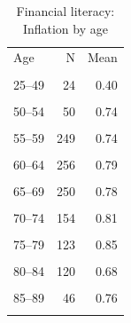 \begin{table}[htbp]\centering\small
\caption{Financial literacy: Inflation by age}
\label{tab:finlit_q2_by_age}
\begin{tabular}{lrr}\toprule
Age & N & Mean \\\\ \midrule
25--49 & 24 & 0.40 \\\\
50--54 & 50 & 0.74 \\\\
55--59 & 249 & 0.74 \\\\
60--64 & 256 & 0.79 \\\\
65--69 & 250 & 0.78 \\\\
70--74 & 154 & 0.81 \\\\
75--79 & 123 & 0.85 \\\\
80--84 & 120 & 0.68 \\\\
85--89 & 46 & 0.76 \\\\
\bottomrule
\end{tabular}\end{table}
